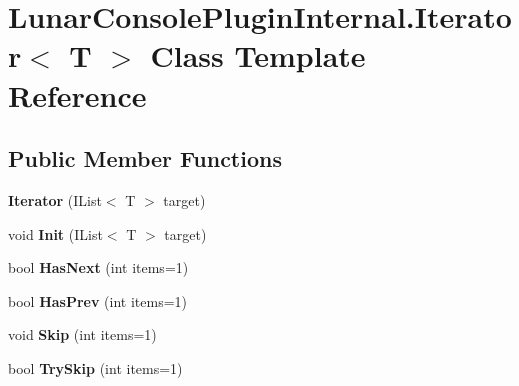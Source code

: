 \hypertarget{class_lunar_console_plugin_internal_1_1_iterator}{}\section{Lunar\+Console\+Plugin\+Internal.\+Iterator$<$ T $>$ Class Template Reference}
\label{class_lunar_console_plugin_internal_1_1_iterator}
\subsection*{Public Member Functions}
\begin{DoxyCompactItemize}
\item 
\mbox{\label{class_lunar_console_plugin_internal_1_1_iterator_aeca4011f9fa366833dc22d0a4707bf48}} 
{\bfseries Iterator} (I\+List$<$ T $>$ target)
\item 
\mbox{\label{class_lunar_console_plugin_internal_1_1_iterator_a201d41bba03f6e36de403c6b3cd07fbb}} 
void {\bfseries Init} (I\+List$<$ T $>$ target)
\item 
\mbox{\label{class_lunar_console_plugin_internal_1_1_iterator_a752d7adc1ee48a5767b297751232f877}} 
bool {\bfseries Has\+Next} (int items=1)
\item 
\mbox{\label{class_lunar_console_plugin_internal_1_1_iterator_a54f7a68241b4fbed5b341d63abd147bb}} 
bool {\bfseries Has\+Prev} (int items=1)
\item 
\mbox{\label{class_lunar_console_plugin_internal_1_1_iterator_a982d335abda358943e10a84e4ef7e120}} 
void {\bfseries Skip} (int items=1)
\item 
\mbox{\label{class_lunar_console_plugin_internal_1_1_iterator_ab4449a1ac6e31d5fafbffefbff178888}} 
bool {\bfseries Try\+Skip} (int items=1)
\item 
\mbox{\label{class_lunar_console_plugin_internal_1_1_iterator_ae3c96a615e7f55245cd489aaf675de5c}} 

\end{DoxyCompactItemize}
